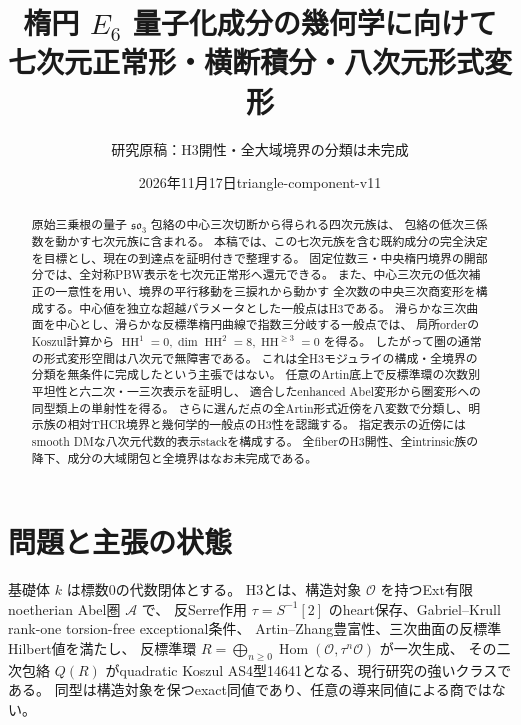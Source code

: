 \documentclass[11pt,a4paper]{ltjsarticle}
\title{楕円 $E_6$ 量子化成分の幾何学に向けて\\\large 七次元正常形・横断積分・八次元形式変形}
\author{研究原稿：H3開性・全大域境界の分類は未完成}
\date{2026年11月17日\quad triangle-component-v11}
\theoremstyle{definition}\newtheorem{definition}[theorem]{定義}
\theoremstyle{remark}\newtheorem{remark}[theorem]{注意}
\newcommand{\HH}{\operatorname{HH}}
\newcommand{\Hom}{\operatorname{Hom}}
\newcommand{\OO}{\mathcal O}
\begin{document}
\maketitle
\begin{abstract}
原始三乗根の量子 $\mathfrak{so}_3$ 包絡の中心三次切断から得られる四次元族は、
包絡の低次三係数を動かす七次元族に含まれる。
本稿では、この七次元族を含む既約成分の完全決定を目標とし、現在の到達点を証明付きで整理する。
固定位数三・中央楕円境界の開部分では、全対称PBW表示を七次元正常形へ還元できる。
また、中心三次元の低次補正の一意性を用い、境界の平行移動を三捩れから動かす
全次数の中央三次商変形を構成する。中心値を独立な超越パラメータとした一般点はH3である。
滑らかな三次曲面を中心とし、滑らかな反標準楕円曲線で指数三分岐する一般点では、
局所orderのKoszul計算から $\HH^1=0,\dim\HH^2=8,\HH^{\ge3}=0$ を得る。
したがって圏の通常の形式変形空間は八次元で無障害である。
これは全H3モジュライの構成・全境界の分類を無条件に完成したという主張ではない。
任意のArtin底上で反標準環の次数別平坦性と六二次・一三次表示を証明し、
適合したenhanced Abel変形から圏変形への同型類上の単射性を得る。
さらに選んだ点の全Artin形式近傍を八変数で分類し、明示族の相対THCR境界と幾何学的一般点のH3性を認識する。
指定表示の近傍にはsmooth DMな八次元代数的表示stackを構成する。
全fiberのH3開性、全intrinsic族の降下、成分の大域閉包と全境界はなお未完成である。
\end{abstract}
\tableofcontents

\section{問題と主張の状態}
基礎体 $k$ は標数0の代数閉体とする。
H3とは、構造対象 $\OO$ を持つExt有限noetherian Abel圏 $\mathcal A$ で、
反Serre作用 $\tau=S^{-1}[2]$ のheart保存、Gabriel--Krull rank-one torsion-free exceptional条件、
Artin--Zhang豊富性、三次曲面の反標準Hilbert値を満たし、
反標準環 $R=\bigoplus_{n\ge0}\Hom(\OO,\tau^n\OO)$ が一次生成、
その二次包絡 $Q(R)$ がquadratic Koszul AS4型14641となる、現行研究の強いクラスである。
同型は構造対象を保つexact同値であり、任意の導来同値による商ではない。
\end{document}
